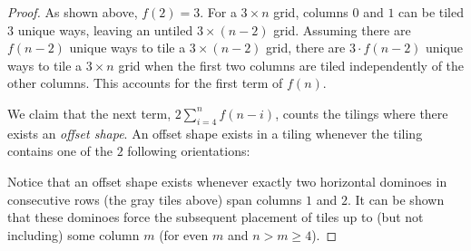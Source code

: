 \documentclass{article}
\begin{document}
\begin{proof}
    As shown above, $f(2) = 3$. For a \(3 \times n\) grid, columns $0$ and $1$ can be tiled \(3\) unique ways, leaving an untiled \(3 \times (n-2)\) grid. Assuming there are \(f(n-2)\) unique ways to tile a \(3 \times (n-2)\) grid, there are \(3\cdot f(n-2)\) unique ways to tile a \(3 \times n\) grid when the first two columns are tiled independently of the other columns. This accounts for the first term of $f(n)$.
    
    We claim that the next term, $2\sum_{i = 4}^{n}f(n-i)$, counts the tilings where there exists an \textit{offset shape}. An offset shape exists in a tiling whenever the tiling contains one of the $2$ following orientations:
    
    \begin{figure}[H]
        \centering
        \captionsetup{labelsep=none} %
        \setlength{\tabcolsep}{1pt}
        \renewcommand{\arraystretch}{0.8}
    \caption{}
    \label{figure4}
    \end{figure}
    
    \begin{figure}[H]
        \centering
        \captionsetup{labelsep=none} %
        \setlength{\tabcolsep}{1pt}
        \renewcommand{\arraystretch}{0.8}
    \caption{}
    \label{figure5}
    \end{figure}
    
    Notice that an offset shape exists whenever exactly two horizontal dominoes in consecutive rows (the gray tiles above) span columns $1$ and $2$. It can be shown that these dominoes force the subsequent placement of tiles up to (but not including) some column $m$ (for even $m$ and $n > m \geq 4$). 
    

\end{proof}
\end{document}

